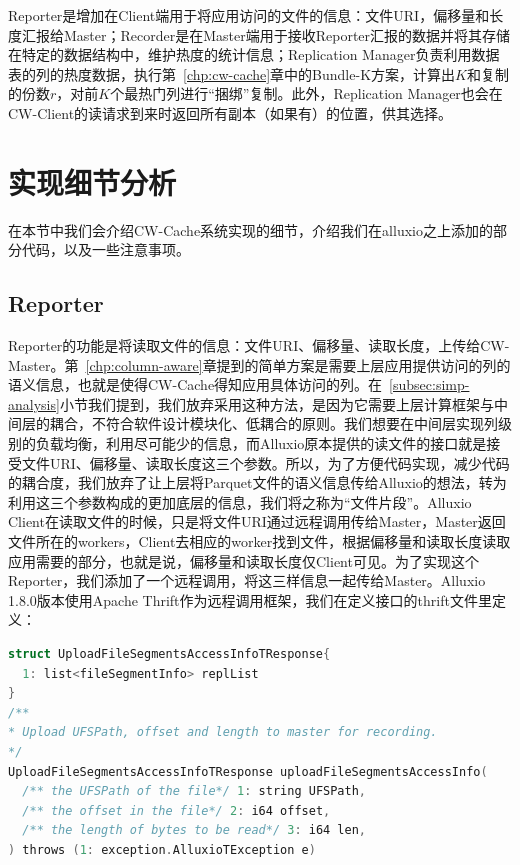\par Reporter是增加在Client端用于将应用访问的文件的信息：文件URI，偏移量和长度汇报给Master；Recorder是在Master端用于接收Reporter汇报的数据并将其存储在特定的数据结构中，维护热度的统计信息；Replication Manager负责利用数据表的列的热度数据，执行第~\ref{chp:cw-cache}章中的Bundle-K方案，计算出$K$和复制的份数$r$，对前$K$个最热门列进行“捆绑”复制。此外，Replication Manager也会在CW-Client的读请求到来时返回所有副本（如果有）的位置，供其选择。

\section{实现细节分析}
\label{sec:impl-details}

\par 在本节中我们会介绍CW-Cache系统实现的细节，介绍我们在alluxio之上添加的部分代码，以及一些注意事项。

\subsection{Reporter}

\par Reporter的功能是将读取文件的信息：文件URI、偏移量、读取长度，上传给CW-Master。第~\ref{chp:column-aware}章提到的简单方案是需要上层应用提供访问的列的语义信息，也就是使得CW-Cache得知应用具体访问的列。在~\ref{subsec:simp-analysis}小节我们提到，我们放弃采用这种方法，是因为它需要上层计算框架与中间层的耦合，不符合软件设计模块化、低耦合的原则。我们想要在中间层实现列级别的负载均衡，利用尽可能少的信息，而Alluxio原本提供的读文件的接口就是接受文件URI、偏移量、读取长度这三个参数。所以，为了方便代码实现，减少代码的耦合度，我们放弃了让上层将Parquet文件的语义信息传给Alluxio的想法，转为利用这三个参数构成的更加底层的信息，我们将之称为“文件片段”。Alluxio Client在读取文件的时候，只是将文件URI通过远程调用传给Master，Master返回文件所在的workers，Client去相应的worker找到文件，根据偏移量和读取长度读取应用需要的部分，也就是说，偏移量和读取长度仅Client可见。为了实现这个Reporter，我们添加了一个远程调用，将这三样信息一起传给Master。Alluxio 1.8.0版本使用Apache Thrift作为远程调用框架，我们在定义接口的thrift文件里定义：

\begin{lstlisting}[language=c]
struct UploadFileSegmentsAccessInfoTResponse{
  1: list<fileSegmentInfo> replList
}
/**
* Upload UFSPath, offset and length to master for recording.
*/
UploadFileSegmentsAccessInfoTResponse uploadFileSegmentsAccessInfo(
  /** the UFSPath of the file*/ 1: string UFSPath,
  /** the offset in the file*/ 2: i64 offset,
  /** the length of bytes to be read*/ 3: i64 len,
) throws (1: exception.AlluxioTException e)
\end{lstlisting}


